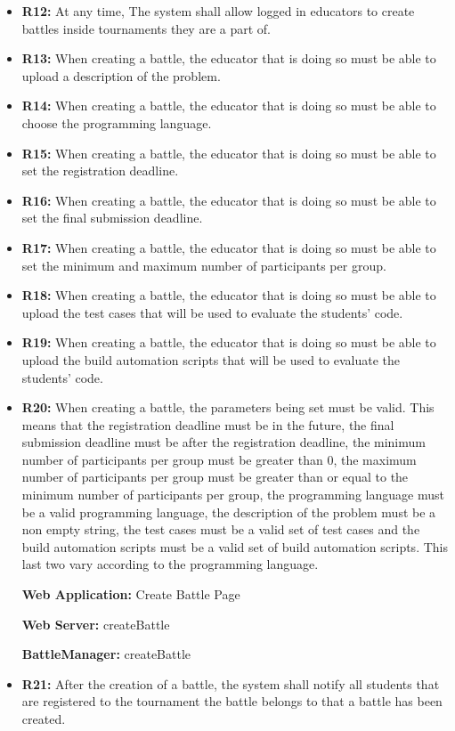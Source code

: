 \documentclass{article}
\begin{document}
\begin{itemize}
    \item \textbf{R12:} At any time, The system shall allow logged in educators to create battles inside tournaments they are a part of.
    \item \textbf{R13:} When creating a battle, the educator that is doing so must be able to upload a description of the problem.
    \item \textbf{R14:} When creating a battle, the educator that is doing so must be able to choose the programming language.
    \item \textbf{R15:} When creating a battle, the educator that is doing so must be able to set the registration deadline.
    \item \textbf{R16:} When creating a battle, the educator that is doing so must be able to set the final submission deadline.
    \item \textbf{R17:} When creating a battle, the educator that is doing so must be able to set the minimum and maximum number of participants per group.
    \item \textbf{R18:} When creating a battle, the educator that is doing so must be able to upload the test cases that will be used to evaluate the students' code.
    \item \textbf{R19:} When creating a battle, the educator that is doing so must be able to upload the build automation scripts that will be used to evaluate the students' code.
    \item \textbf{R20:} When creating a battle, the parameters being set must be valid. This means that the registration deadline must be in the future, the final submission deadline must be after the registration deadline, the minimum number of participants per group must be greater than 0, the maximum number of participants per group must be greater than or equal to the minimum number of participants per group, the programming language must be a valid programming language, the description of the problem must be a non empty string, the test cases must be a valid set of test cases and the build automation scripts must be a valid set of build automation scripts. This last two vary according to the programming language.

    \textbf{Web Application:} Create Battle Page

    \textbf{Web Server:} createBattle

    \textbf{BattleManager:} createBattle

    \item \textbf{R21:} After the creation of a battle, the system shall notify all students that are registered to the tournament the battle belongs to that a battle has been created.


\end{itemize}
\end{document}
